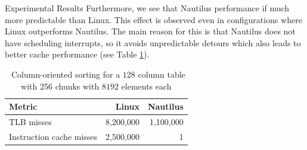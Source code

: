 \begin{block}{Experimental Results}
  Furthermore, we see that Nautilus performance if much more predictable than Linux. This effect is observed even in configurations where Linux outperforms Nautilus. The main reason for this is that Nautilus does not have scheduling interrupts, so it avoids unpredictable detours which also leads to better cache performance (see Table \ref{table:cache_miss-col}).

    \begin{table}
      \bgroup
      \def\arraystretch{1.3}%
      \setlength\tabcolsep{1cm}
      \begin{tabular}{l || r | r }
        \textbf{Metric}  & \textbf{Linux} & \textbf{Nautilus} \\
        \hline\hline
        TLB misses               & 8,200,000 & 1,100,000 \\
        Instruction cache misses & 2,500,000 &         1 \\

      \end{tabular}
\egroup
      \caption{~Column-oriented sorting for a $128$ column table with 256 chunks with $8192$ elements each}
      \label{table:cache_miss-col}
    \end{table}
  

\end{block}

